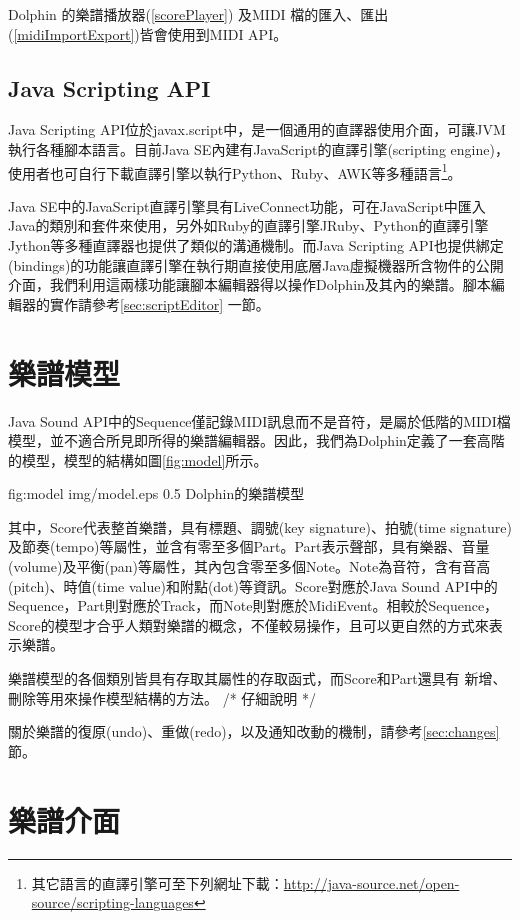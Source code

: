 \documentclass[12pt,a4paper,oneside]{report}
\begin{document}
Dolphin 的樂譜播放器(\ref{scorePlayer}) 及MIDI 檔的匯入、匯出(\ref{midiImportExport})皆會使用到MIDI API。

\subsection{Java Scripting API} %

Java Scripting API位於javax.script中，是一個通用的直譯器使用介面，可讓JVM 執行各種腳本語言。目前Java SE內建有JavaScript的直譯引擎(scripting engine)，使用者也可自行下載直譯引擎以執行Python、Ruby、AWK等多種語言\footnote{其它語言的直譯引擎可至下列網址下載：\url{http://java-source.net/open-source/scripting-languages}}。

Java SE中的JavaScript直譯引擎具有LiveConnect功能，可在JavaScript中匯入Java的類別和套件來使用，另外如Ruby的直譯引擎JRuby、Python的直譯引擎Jython等多種直譯器也提供了類似的溝通機制。而Java Scripting API也提供綁定(bindings)的功能讓直譯引擎在執行期直接使用底層Java虛擬機器所含物件的公開介面，我們利用這兩樣功能讓腳本編輯器得以操作Dolphin及其內的樂譜。腳本編輯器的實作請參考\ref{sec:scriptEditor} 一節。

\section{樂譜模型}

Java Sound API中的Sequence僅記錄MIDI訊息而不是音符，是屬於低階的MIDI檔模型，並不適合所見即所得的樂譜編輯器。因此，我們為Dolphin定義了一套高階的模型，模型的結構如圖\ref{fig:model}所示。

\figurewithcaption
{fig:model}
{img/model.eps}
{0.5}
{Dolphin的樂譜模型}

其中，Score代表整首樂譜，具有標題、調號(key signature)、拍號(time signature)及節奏(tempo)等屬性，並含有零至多個Part。Part表示聲部，具有樂器、音量(volume)及平衡(pan)等屬性，其內包含零至多個Note。Note為音符，含有音高(pitch)、時值(time value)和附點(dot)等資訊。Score對應於Java Sound API中的Sequence，Part則對應於Track，而Note則對應於MidiEvent。相較於Sequence，Score的模型才合乎人類對樂譜的概念，不僅較易操作，且可以更自然的方式來表示樂譜。

樂譜模型的各個類別皆具有存取其屬性的存取函式，而Score和Part還具有
新增、刪除等用來操作模型結構的方法。 /*  
仔細說明  
*/

關於樂譜的復原(undo)、重做(redo)，以及通知改動的機制，請參考\ref{sec:changes} 節。


\section{樂譜介面} %
\end{document}
